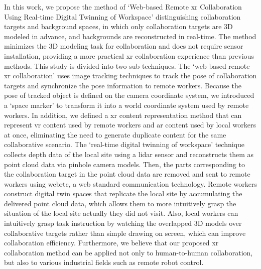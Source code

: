 {In this work, we propose the method of `Web-based Remote \acrshort{xr} Collaboration Using Real-time Digital Twinning of Workspace' distinguishing collaboration targets and background spaces, in which only collaboration targets are 3D modeled in advance, and backgrounds are reconstructed in real-time. The method minimizes the 3D modeling task for collaboration and does not require sensor installation, providing a more practical \acrshort{xr} collaboration experience than previous methods. This study is divided into two sub-techniques. The `web-based remote \acrshort{xr} collaboration' uses image tracking techniques to track the pose of collaboration targets and synchronize the pose information to remote workers. Because the pose of tracked object is defined on the camera coordinate system, we introduced a `space marker' to transform it into a world coordinate system used by remote workers. In addition, we defined a \acrshort{xr} content representation method that can represent \acrshort{vr} content used by remote workers and \acrshort{ar} content used by local workers at once, eliminating the need to generate duplicate content for the same collaborative scenario. The `real-time digital twinning of workspace' technique collects depth data of the local site using a \acrshort{lidar} sensor and reconstructs them as point cloud data via pinhole camera models. Then, the parts corresponding to the collaboration target in the point cloud data are removed and sent to remote workers using \acrshort{webrtc}, a web standard communication technology. Remote workers construct digital twin spaces that replicate the local site by accumulating the delivered point cloud data, which allows them to more intuitively grasp the situation of the local site actually they did not visit. Also, local workers can intuitively grasp task instruction by watching the overlapped 3D models over collaborative targets rather than simple drawing on screen, which can improve collaboration efficiency. Furthermore, we believe that our proposed \acrshort{xr} collaboration method can be applied not only to human-to-human collaboration, but also to various industrial fields such as remote robot control.

}
